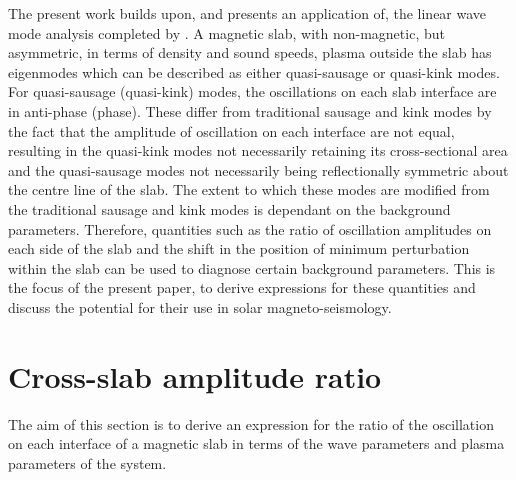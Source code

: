 \documentclass[namedreferences]{solarphysics}
\numberwithin{equation}{section}
\begin{document}
\begin{article}
The present work builds upon, and presents an application of, the linear wave mode analysis completed by \cite{all_etal17}. A magnetic slab, with non-magnetic, but asymmetric, in terms of density and sound speeds, plasma outside the slab has eigenmodes which can be described as either quasi-sausage or quasi-kink modes. For quasi-sausage (quasi-kink) modes, the oscillations on each slab interface are in anti-phase (phase). These differ from traditional sausage and kink modes by the fact that the amplitude of oscillation on each interface are not equal, resulting in the quasi-kink modes not necessarily retaining its cross-sectional area and the quasi-sausage modes not necessarily being reflectionally symmetric about the centre line of the slab. The extent to which these modes are modified from the traditional sausage and kink modes is dependant on the background parameters. Therefore, quantities such as the ratio of oscillation amplitudes on each side of the slab and the shift in the position of minimum perturbation within the slab can be used to diagnose certain background parameters. This is the focus of the present paper, to derive expressions for these quantities and discuss the potential for their use in solar magneto-seismology.


\section{Cross-slab amplitude ratio} \label{sec: CSAR}
The aim of this section is to derive an expression for the ratio of the oscillation on each interface of a magnetic slab in terms of the wave parameters and plasma parameters of the system.


\end{article}
\end{document}
